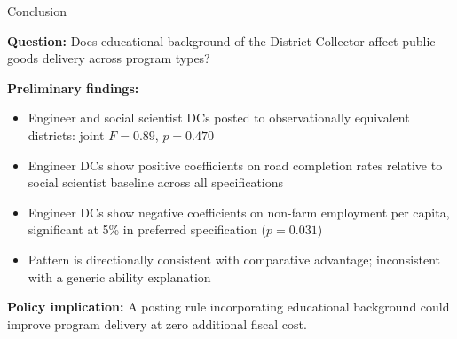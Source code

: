 \documentclass[aspectratio=169]{beamer}
\begin{document}
\begin{frame}{Conclusion}

\textbf{Question:} Does educational background of the District Collector affect public goods delivery across program types?

\bigskip

\textbf{Preliminary findings:}
\begin{itemize}
    \item Engineer and social scientist DCs posted to observationally equivalent districts: joint $F = 0.89$, $p = 0.470$
    \item Engineer DCs show positive coefficients on road completion rates relative to social scientist baseline across all specifications
    \item Engineer DCs show negative coefficients on non-farm employment per capita, significant at 5\% in preferred specification ($p = 0.031$)
    \item Pattern is directionally consistent with comparative advantage; inconsistent with a generic ability explanation
\end{itemize}

\bigskip

\textbf{Policy implication:} A posting rule incorporating educational background could improve program delivery at zero additional fiscal cost.

\bigskip

\end{frame}
\end{document}
